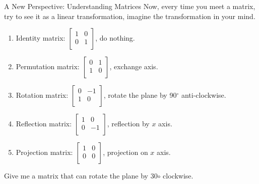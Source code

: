 \documentclass{beamer}
\begin{document}
\begin{frame}{A New Perspective: Understanding Matrices}
Now, every time you meet a matrix, try to see it as a linear transformation, imagine the transformation in your mind.

\begin{enumerate}
    \item Identity matrix: $\left[ \begin{matrix}
        1&		0\\
        0&		1\\
    \end{matrix} \right]$, do nothing.
    \item Permutation matrix: $\left[ \begin{matrix}
        0&		1\\
        1&		0\\
    \end{matrix} \right]$, exchange axis.
    \item Rotation matrix: $\left[ \begin{matrix}
        0&		-1\\
        1&		0\\
    \end{matrix} \right]$, rotate the plane by 90$^\circ$ anti-clockwise.
    \item Reflection matrix: $\left[ \begin{matrix}
        1&		0\\
        0&		-1\\
    \end{matrix} \right]$, reflection by $x$ axis.
    \item Projection matrix: $\left[ \begin{matrix}
        1&		0\\
        0&		0\\
    \end{matrix} \right]$, projection on $x$ axis.
\end{enumerate}
Give me a matrix that can rotate the plane by 30$\circ$ clockwise.
\end{frame}
\end{document}
